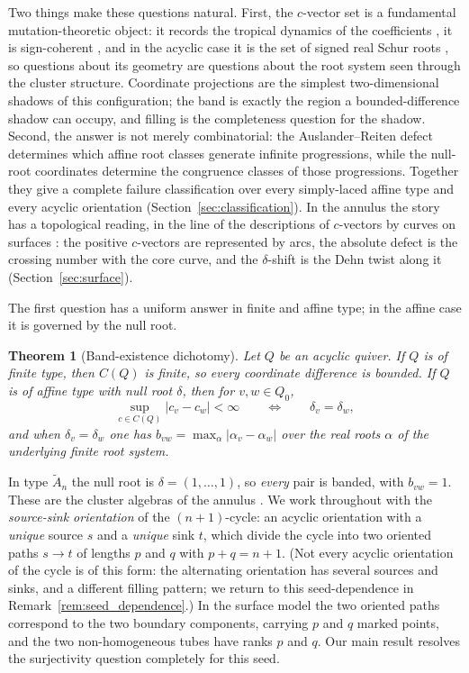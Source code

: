 \documentclass[11pt, a4paper]{amsart}
\newtheorem{theorem}{Theorem}[section]
\theoremstyle{definition}
\begin{document}
Two things make these questions natural. First, the $c$-vector set is a
fundamental mutation-theoretic object: it records the tropical dynamics of the
coefficients \cite{FominZelevinsky2007, NakanishiZelevinsky2012}, it is
sign-coherent \cite{GHKK2018}, and in the acyclic case it is the set of
signed real Schur roots \cite{NajeraChavez2013, SpeyerThomas2013}, so
questions about its geometry are questions about the root system seen
through the cluster structure. Coordinate projections are the simplest
two-dimensional shadows of this configuration; the band is exactly the
region a bounded-difference shadow can occupy, and filling is the
completeness question for the shadow. Second, the answer is not merely
combinatorial: the Auslander--Reiten defect determines which affine root
classes generate infinite progressions, while the null-root coordinates
determine the congruence classes of those progressions. Together they give
a complete failure classification over every simply-laced affine type and
every acyclic orientation (Section~\ref{sec:classification}). In the annulus the story has a
topological reading, in the line of the descriptions of $c$-vectors by
curves on surfaces \cite{FominShapiroThurston2008, Hong2021,
LeeLeeMills2019}: the positive $c$-vectors are represented by arcs, the
absolute defect is the crossing number with the core curve, and the
$\delta$-shift is the Dehn twist along it (Section~\ref{sec:surface}).

The first question has a uniform answer in finite and affine type; in the
affine case it is governed by the null root.

\begin{theorem}[Band-existence dichotomy]
\label{thm:band_dichotomy}
Let $Q$ be an acyclic quiver. If $Q$ is of finite type, then $C(Q)$ is
finite, so every coordinate difference is bounded. If $Q$ is of affine
type with null root $\delta$, then for $v, w \in Q_0$,
\[
  \sup_{c \in C(Q)} |c_v - c_w| < \infty
  \qquad\Longleftrightarrow\qquad
  \delta_v = \delta_w,
\]
and when $\delta_v = \delta_w$ one has
$b_{vw} = \max_{\alpha} |\alpha_v - \alpha_w|$ over the real roots
$\alpha$ of the underlying finite root system.
\end{theorem}

In type $\widetilde{A}_n$ the null root is $\delta = (1, \dots, 1)$, so
\emph{every} pair is banded, with $b_{vw} = 1$. These are the cluster
algebras of the annulus \cite{FominShapiroThurston2008}. We work throughout
with the \emph{source-sink orientation} of the $(n+1)$-cycle: an acyclic
orientation with a \emph{unique} source $s$ and a \emph{unique} sink $t$,
which divide the cycle into two oriented paths $s \to t$ of lengths $p$ and
$q$ with $p + q = n + 1$. \textup{(}Not every acyclic orientation of the
cycle is of this form: the alternating orientation has several sources and
sinks, and a different filling pattern; we return to this seed-dependence in
Remark~\ref{rem:seed_dependence}.\textup{)} In the surface model the two
oriented paths correspond to the two boundary components, carrying $p$ and
$q$ marked points, and the two non-homogeneous tubes have ranks $p$ and $q$.
Our main result resolves the surjectivity question completely for this seed.
\end{document}
